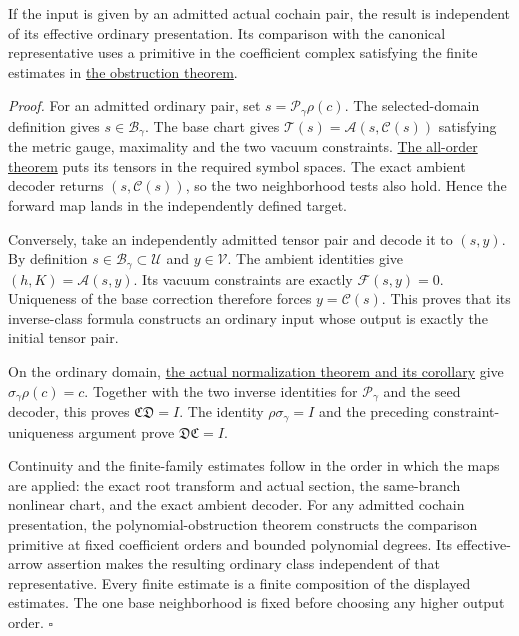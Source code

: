 \documentclass[
  english,
  11pt,
  reqno]{amsart}
\begin{document}
If the input is given by an admitted actual cochain pair, the result is
independent of its effective ordinary presentation. Its comparison with
the canonical representative uses a primitive in the coefficient complex
satisfying the finite estimates in
\hyperref[thm:online-actual-cochain-obstruction-test]{the obstruction
theorem}.

\emph{Proof.} For an admitted ordinary pair, set
\(s=\mathscr P_\gamma\rho(c)\). The selected-domain definition gives
\(s\in\mathcal B_\gamma\). The base chart gives
\(\mathcal T(s)=\mathcal A(s,\mathcal C(s))\) satisfying the metric
gauge, maximality and the two vacuum constraints.
\hyperref[thm:online-chart-one-branch-weighted-smoothness]{The all-order
theorem} puts its tensors in the required symbol spaces. The exact
ambient decoder returns \((s,\mathcal C(s))\), so the two neighborhood
tests also hold. Hence the forward map lands in the independently
defined target.

Conversely, take an independently admitted tensor pair and decode it to
\((s,y)\). By definition \(s\in\mathcal B_\gamma\subset\mathcal U\) and
\(y\in\mathcal V\). The ambient identities give
\((h,K)=\mathcal A(s,y)\). Its vacuum constraints are exactly
\(\mathcal F(s,y)=0\). Uniqueness of the base correction therefore
forces \(y=\mathcal C(s)\). This proves that its inverse-class formula
constructs an ordinary input whose output is exactly the initial tensor
pair.

On the ordinary domain,
\hyperref[cor:online-effective-ordinary-class-identification]{the actual
normalization theorem and its corollary} give
\(\sigma_\gamma\rho(c)=c\). Together with the two inverse identities for
\(\mathscr P_\gamma\) and the seed decoder, this proves
\(\mathfrak C\mathfrak D=I\). The identity \(\rho\sigma_\gamma=I\) and
the preceding constraint-uniqueness argument prove
\(\mathfrak D\mathfrak C=I\).

Continuity and the finite-family estimates follow in the order in which
the maps are applied: the exact root transform and actual section, the
same-branch nonlinear chart, and the exact ambient decoder. For any
admitted cochain presentation, the polynomial-obstruction theorem
constructs the comparison primitive at fixed coefficient orders and
bounded polynomial degrees. Its effective-arrow assertion makes the
resulting ordinary class independent of that representative. Every
finite estimate is a finite composition of the displayed estimates. The
one base neighborhood is fixed before choosing any higher output order.
\hfill\(\square\)
\end{document}
